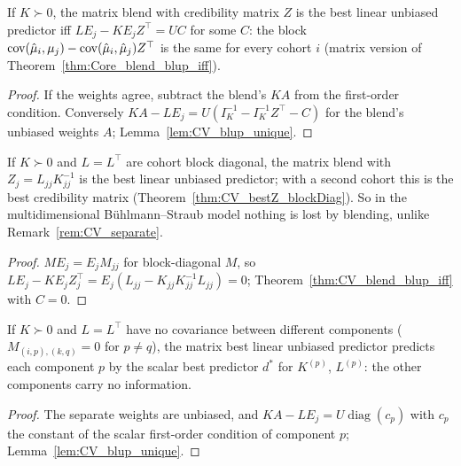\begin{theorem}\label{thm:CV_blend_blup_iff}
  \leanok
  If $K \succ 0$, the matrix blend with credibility matrix $Z$ is the best linear unbiased
  predictor iff $LE_j - KE_jZ^\top = UC$ for some $C$: the block
  $\operatorname{cov}(\hat\mu_i, \mu_j) - \operatorname{cov}(\hat\mu_i, \hat\mu_j)Z^\top$ is the same for every cohort $i$
  (matrix version of Theorem~\ref{thm:Core_blend_blup_iff}).
\end{theorem}
\begin{proof}
  \leanok
  If the weights agree, subtract the blend's $KA$ from the first-order condition. Conversely
  $KA - LE_j = U(I_K^{-1} - I_K^{-1}Z^\top - C)$ for the blend's unbiased weights $A$;
  Lemma~\ref{lem:CV_blup_unique}.
\end{proof}

\begin{theorem}\label{thm:CV_blend_blup_blockDiag}
  \leanok
  If $K \succ 0$ and $L = L^\top$ are cohort block diagonal, the matrix blend with
  $Z_j = L_{jj}K_{jj}^{-1}$ is the best linear unbiased predictor; with a second cohort this
  is the best credibility matrix (Theorem~\ref{thm:CV_bestZ_blockDiag}). So in the
  multidimensional Bühlmann--Straub model nothing is lost by blending, unlike
  Remark~\ref{rem:CV_separate}.
\end{theorem}
\begin{proof}
  \leanok
  $ME_j = E_jM_{jj}$ for block-diagonal $M$, so
  $LE_j - KE_jZ_j^\top = E_j(L_{jj} - K_{jj}K_{jj}^{-1}L_{jj}) = 0$;
  Theorem~\ref{thm:CV_blend_blup_iff} with $C = 0$.
\end{proof}

\begin{theorem}\label{thm:CV_blup_separate}
  \leanok
  If $K \succ 0$ and $L = L^\top$ have no covariance between different components
  ($M_{(i,p),(k,q)} = 0$ for $p \ne q$), the matrix best linear unbiased predictor predicts
  each component $p$ by the scalar best predictor $d^\ast$ for $K^{(p)}$, $L^{(p)}$: the
  other components carry no information.
\end{theorem}
\begin{proof}
  \leanok
  The separate weights are unbiased, and $KA - LE_j = U\operatorname{diag}(c_p)$ with $c_p$
  the constant of the scalar first-order condition of component $p$;
  Lemma~\ref{lem:CV_blup_unique}.
\end{proof}


